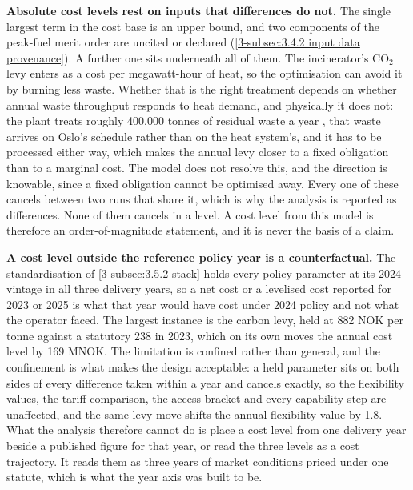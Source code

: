 \textbf{Absolute cost levels rest on inputs that differences do not.} The single largest term in the cost base is an upper bound, and two components of the peak-fuel merit order are uncited or declared (\autoref{3-subsec:3.4.2 input data provenance}). A further one sits underneath all of them. The incinerator's CO$_2$ levy enters as a cost per megawatt-hour of heat, so the optimisation can avoid it by burning less waste. Whether that is the right treatment depends on whether annual waste throughput responds to heat demand, and physically it does not: the plant treats roughly 400{,}000 tonnes of residual waste a year \cite{dsbno_bygging_2026}, that waste arrives on Oslo's schedule rather than on the heat system's, and it has to be processed either way, which makes the annual levy closer to a fixed obligation than to a marginal cost. The model does not resolve this, and the direction is knowable, since a fixed obligation cannot be optimised away. Every one of these cancels between two runs that share it, which is why the analysis is reported as differences. None of them cancels in a level. A cost level from this model is therefore an order-of-magnitude statement, and it is never the basis of a claim.

\textbf{A cost level outside the reference policy year is a counterfactual.} The standardisation of \autoref{3-subsec:3.5.2 stack} holds every policy parameter at its 2024 vintage in all three delivery years, so a net cost or a levelised cost reported for 2023 or 2025 is what that year would have cost under 2024 policy and not what the operator faced. The largest instance is the carbon levy, held at 882 NOK per tonne against a statutory 238 in 2023, which on its own moves the annual cost level by 169 MNOK. The limitation is confined rather than general, and the confinement is what makes the design acceptable: a held parameter sits on both sides of every difference taken within a year and cancels exactly, so the flexibility values, the tariff comparison, the access bracket and every capability step are unaffected, and the same levy move shifts the annual flexibility value by 1.8. What the analysis therefore cannot do is place a cost level from one delivery year beside a published figure for that year, or read the three levels as a cost trajectory. It reads them as three years of market conditions priced under one statute, which is what the year axis was built to be.

